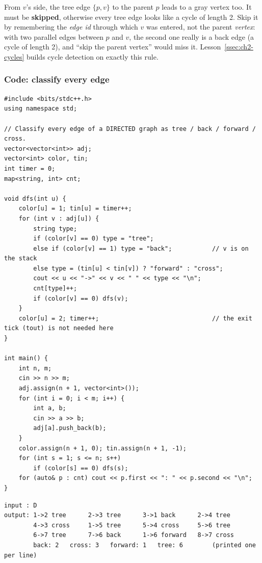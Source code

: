 \begin{warningbox}
From $v$'s side, the tree edge $\{p, v\}$ to the parent $p$ leads to a gray vertex too. It must be \textbf{skipped}, otherwise every tree edge looks like a cycle of length 2. Skip it by remembering the \emph{edge id} through which $v$ was entered, not the parent \emph{vertex}: with two parallel edges between $p$ and $v$, the second one really is a back edge (a cycle of length 2), and ``skip the parent vertex'' would miss it. Lesson~\ref{ssec:ch2-cycles} builds cycle detection on exactly this rule.
\end{warningbox}

\subsubsection*{Code: classify every edge}

\begin{lstlisting}[style=cpp]
#include <bits/stdc++.h>
using namespace std;

// Classify every edge of a DIRECTED graph as tree / back / forward / cross.
vector<vector<int>> adj;
vector<int> color, tin;
int timer = 0;
map<string, int> cnt;

void dfs(int u) {
    color[u] = 1; tin[u] = timer++;
    for (int v : adj[u]) {
        string type;
        if (color[v] == 0) type = "tree";
        else if (color[v] == 1) type = "back";           // v is on the stack
        else type = (tin[u] < tin[v]) ? "forward" : "cross";
        cout << u << "->" << v << " " << type << "\n";
        cnt[type]++;
        if (color[v] == 0) dfs(v);
    }
    color[u] = 2; timer++;                               // the exit tick (tout) is not needed here
}

int main() {
    int n, m;
    cin >> n >> m;
    adj.assign(n + 1, vector<int>());
    for (int i = 0; i < m; i++) {
        int a, b;
        cin >> a >> b;
        adj[a].push_back(b);
    }
    color.assign(n + 1, 0); tin.assign(n + 1, -1);
    for (int s = 1; s <= n; s++)
        if (color[s] == 0) dfs(s);
    for (auto& p : cnt) cout << p.first << ": " << p.second << "\n";
}
\end{lstlisting}

\begin{lstlisting}[style=trace]
input : D
output: 1->2 tree      2->3 tree      3->1 back      2->4 tree
        4->3 cross     1->5 tree      5->4 cross     5->6 tree
        6->7 tree      7->6 back      1->6 forward   8->7 cross
        back: 2   cross: 3   forward: 1   tree: 6        (printed one per line)
\end{lstlisting}

